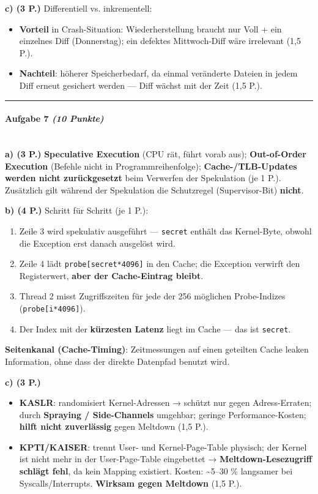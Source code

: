 \documentclass[11pt, a4paper]{article}
\begin{document}
\textbf{c) (3 P.)} Differentiell vs. inkrementell:

\begin{itemize}
  \item \textbf{Vorteil} in Crash-Situation: Wiederherstellung braucht nur Voll + ein einzelnes Diff (Donnerstag); ein defektes Mittwoch-Diff wäre irrelevant (1,5 P.).
  \item \textbf{Nachteil}: höherer Speicherbedarf, da einmal veränderte Dateien in jedem Diff erneut gesichert werden — Diff wächst mit der Zeit (1,5 P.).
\end{itemize}


\noindent\textcolor{rulegray}{\rule{\linewidth}{0.4pt}}


\paragraph{Aufgabe 7 \textit{(10 Punkte)}}\mbox{}\\[2pt]

\textbf{a) (3 P.)} \textbf{Speculative Execution} (CPU rät, führt vorab aus); \textbf{Out-of-Order Execution} (Befehle nicht in Programmreihenfolge); \textbf{Cache-/TLB-Updates werden nicht zurückgesetzt} beim Verwerfen der Spekulation (je 1 P.). Zusätzlich gilt während der Spekulation die Schutzregel (Supervisor-Bit) \textbf{nicht}.


\textbf{b) (4 P.)} Schritt für Schritt (je 1 P.):

\begin{enumerate}
  \item Zeile 3 wird spekulativ ausgeführt — \texttt{secret} enthält das Kernel-Byte, obwohl die Exception erst danach ausgelöst wird.
  \item Zeile 4 lädt \texttt{probe[secret*4096]} in den Cache; die Exception verwirft den Registerwert, \textbf{aber der Cache-Eintrag bleibt}.
  \item Thread 2 misst Zugriffszeiten für jede der 256 möglichen Probe-Indizes (\texttt{probe[i*4096]}).
  \item Der Index mit der \textbf{kürzesten Latenz} liegt im Cache — das ist \texttt{secret}.
\end{enumerate}
\textbf{Seitenkanal (Cache-Timing)}: Zeitmessungen auf einen geteilten Cache leaken Information, ohne dass der direkte Datenpfad benutzt wird.


\textbf{c) (3 P.)}

\begin{itemize}
  \item \textbf{KASLR}: randomisiert Kernel-Adressen → schützt nur gegen Adress-Erraten; durch \textbf{Spraying / Side-Channels} umgehbar; geringe Performance-Kosten; \textbf{hilft nicht zuverlässig} gegen Meltdown (1,5 P.).
  \item \textbf{KPTI/KAISER}: trennt User- und Kernel-Page-Table physisch; der Kernel ist nicht mehr in der User-Page-Table eingebettet → \textbf{Meltdown-Lesezugriff schlägt fehl}, da kein Mapping existiert. Kosten: \textasciitilde{}5–30 \% langsamer bei Syscalls/Interrupts. \textbf{Wirksam gegen Meltdown} (1,5 P.).
\end{itemize}




\end{document}
